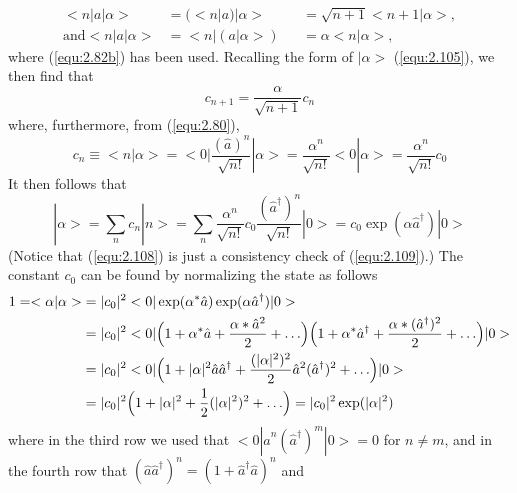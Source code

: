 \begin{subequations}
  \begin{alignat}{4}
    <n|a|\alpha> &= (<n|a)|\alpha> &&=
    \sqrt{n+1}<n+1|\alpha>, \label{equ:2.107a}\\
    \text{and} <n|a|\alpha> &= <n|(a|\alpha>) &&= \alpha
    <n|\alpha>, \label{equ:2.107b}
  \end{alignat}
\end{subequations}
where (\ref{equ:2.82b}) has been used. Recalling the form of
$|\alpha>$ (\ref{equ:2.105}), we then find that
\begin{equation}
  c_{n+1} = \frac{\alpha}{\sqrt{n+1}}c_n
  \label{equ:2.108}
\end{equation}
where, furthermore, from (\ref{equ:2.80}),
\begin{equation}
  c_n \equiv <n|\alpha> =
  <0|\frac{(\hat{a})^n}{\sqrt{n!}}|\alpha> =
  \frac{\alpha^n}{\sqrt{n!}} <0|\alpha> =
  \frac{\alpha^n}{\sqrt{n!}}c_0
  \label{equ:2.109}
\end{equation}
It then follows that
\begin{equation}
  |\alpha> = \sum_n c_n |n> = \sum_n
  \frac{\alpha^n}{\sqrt{n!}}c_0
  \frac{(\hat{a}^{\dagger})^n}{\sqrt{n!}} |0> = c_0
  \exp(\alpha \hat{a}^{\dagger}) |0>
  \label{equ:2.110}
\end{equation}
(Notice that (\ref{equ:2.108}) is just a consistency check
of (\ref{equ:2.109}).) The constant $c_0$ can be found by
normalizing the state as follows
  \begin{alignat}{2}
    1 = <\alpha|\alpha> &= |c_0|^2
    <0|\exp(\alpha^*\hat{a})\exp(\alpha\hat{a}^{\dagger})|0>
    \nonumber\\
    &= |c_0|^2 <0|
    \Bigl(
      1+\alpha^*\hat{a} + \frac{\alpha*\hat{a}^2}{2} +
      \ldots
    \Bigr)
    \Bigl(
    1+\alpha^*\hat{a}^{\dagger} + \frac{\alpha*(\hat{a}^{\dagger})^2}{2} +
      \ldots
    \Bigr)|0>\nonumber\\
    &=
    |c_0|^2<0|
    \Bigl(
      1+|\alpha|^2\hat{a}\hat{a}^{\dagger} +
      \frac{(|\alpha|^2)^2}{2}\hat{a}^2(\hat{a}^{\dagger})^2
      + \ldots
    \Bigr)|0>\nonumber\\
    &=|c_0|^2
    \Bigl(
    1+|\alpha|^2 + \frac{1}{2}(|\alpha|^2)^2 + \ldots
    \Bigr) = |c_0|^2 \exp(|\alpha|^2) \label{equ:2.111}
  \end{alignat}
where in the third row we used that
$<0|\hat{a}^n(\hat{a}^{\dagger})^m|0> = 0$ for $n \neq m$, and
in the fourth row that $(\hat{a}\hat{a}^{\dagger})^n = (1+
\hat{a}^{\dagger}\hat{a})^n$ and
